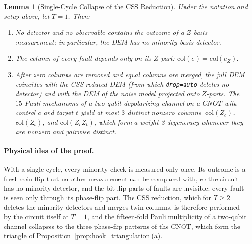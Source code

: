 \documentclass[12pt]{article}
\newtheorem{lemma}{Lemma}
\theoremstyle{definition}
\newcommand{\ttt}[1]{\texttt{#1}}
\begin{document}
\begin{lemma}[Single-Cycle Collapse of the CSS Reduction]\label{lem:single_cycle}
Under the notation and setup above, let $T = 1$. Then:
\begin{enumerate}[label=(\alph*)]
  \item No detector and no observable contains the outcome of a $Z$-basis measurement; in particular, the DEM has no
    minority-basis detector.
  \item The column of every fault depends only on its $Z$-part: $\mathrm{col}(e) = \mathrm{col}(e_Z)$.
  \item After zero columns are removed and equal columns are merged, the full DEM coincides with the CSS-reduced DEM
    (from which \ttt{drop=auto} deletes no detector) and with the DEM of the noise model projected onto $Z$-parts. The
    $15$ Pauli mechanisms of a two-qubit depolarizing channel on a CNOT with control $c$ and target $t$ yield at most
    $3$ distinct nonzero columns, $\mathrm{col}(Z_c)$, $\mathrm{col}(Z_t)$, and $\mathrm{col}(Z_c Z_t)$, which form a
    weight-3 degeneracy whenever they are nonzero and pairwise distinct.
\end{enumerate}
\end{lemma}

\paragraph{Physical idea of the proof.}
With a single cycle, every minority check is measured only once. Its outcome is a fresh coin flip that no other
measurement can be compared with, so the circuit has no minority detector, and the bit-flip parts of faults are
invisible: every fault is seen only through its phase-flip part. The CSS reduction, which for $T \ge 2$ deletes the
minority detectors and merges twin columns, is therefore performed by the circuit itself at $T = 1$, and the
fifteen-fold Pauli multiplicity of a two-qubit channel collapses to the three phase-flip patterns of the CNOT, which
form the triangle of Proposition~\ref{prop:hook_triangulation}(a).
\end{document}
